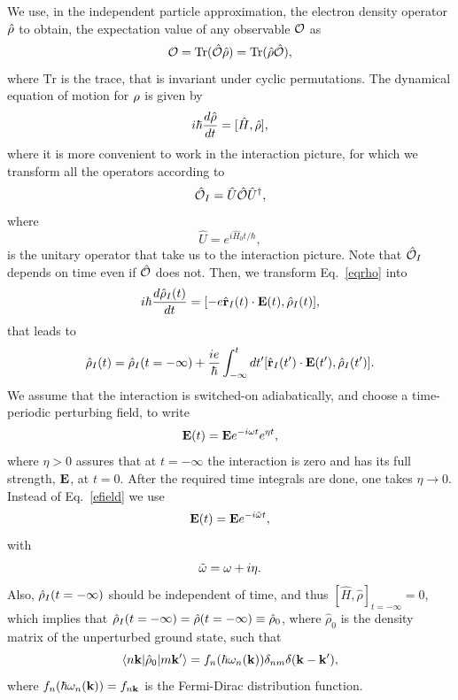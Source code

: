\documentclass{article}
\begin{document}
We use, in the independent particle approximation, the electron density
operator $\hat{{\rho}}$ to obtain, the expectation value of any observable
${\cal O}$ as
\begin{equation}\label{traza}
  {\cal O}=\mathrm{Tr}(\hat{{\cal O}}\hat\rho)=\mathrm{Tr}(\hat\rho\hat{{\cal O}}),
\end{equation}
where $\mathrm{Tr}$ is the trace, that is
invariant under cyclic permutations.
The dynamical equation of motion for ${\rho}$ is given by
\begin{equation}\label{eqrho}
i\hbar \frac{d\hat{{\rho}}}{dt}=[\hat{H},\hat{{\rho}}]
,
\end{equation}
where it is more convenient to work in the interaction picture, for
which we transform all the operators according to 
\begin{equation}\label{ip}
\hat{{\cal O}}_I=\hat{U}\hat{{\cal O}}\hat{U}^\dagger,
\end{equation}
where
\begin{equation}\label{ou}
\hat{U}=e^{i\hat{H}_0t/\hbar},
\end{equation}
is the unitary operator that take us to the interaction picture.
Note that $\hat{{\cal O}}_I$ depends on time even if $\hat{{\cal O}}$ does not.
Then, we transform Eq.~\eqref{eqrho} into
\begin{equation}\label{intrho}
i\hbar\frac{d\hat{{\rho}}_I(t)}{dt}=[-e\hat{\mathbf{r}}_I(t)\cdot\mathbf{E}(t),\hat{{\rho}}_I(t)],
\end{equation}
that leads to
\begin{equation}\label{intrho2}
\hat{{\rho}}_I(t)=\hat{{\rho}}_I(t=-\infty)
+
\frac{ie}{\hbar}\int_{-\infty}^t dt'[\hat{\mathbf{r}}_I(t')\cdot\mathbf{E}(t'),\hat{{\rho}}_I(t')].
\end{equation}
We assume that the interaction is switched-on adiabatically, and
choose a time-periodic perturbing field, to write
\begin{equation}\label{efield}
\mathbf{E}(t)=\mathbf{E} e^{-i\omega t}e^{\eta t}
,
\end{equation}
where $\eta > 0$ assures
that at $t=-\infty$ the interaction is zero and has its full strength, $\mathbf{E}$,
at $t=0$. After the required time integrals are done, one takes
$\eta\to 0$. Instead of Eq.~\eqref{efield} we use
\begin{equation}\label{efield2}
\mathbf{E}(t)=\mathbf{E} e^{-i\tilde\omega t}
,
\end{equation}
with
\begin{equation}\label{got}
\tilde\omega=\omega+i\eta
.
\end{equation}
Also, $\hat{{\rho}}_I(t=-\infty)$ should be independent of time, and thus 
$[\hat{H},\hat\rho]_{t=-\infty}=0$, which implies that 
$\hat{{\rho}}_I(t=-\infty)=\hat\rho(t=-\infty)\equiv\hat\rho_0$,
where $\hat\rho_0$ is
the density matrix of the unperturbed ground state,
such that
\begin{equation}\label{nrhon}
\langle n\mathbf{k} |\hat{{\rho}}_0| m\mathbf{k}' \rangle=f_n(\hbar\omega_n(\mathbf{k}))\delta_{nm}\delta(\mathbf{k}-\mathbf{k}')
,
\end{equation}
where $f_n(\hbar\omega_n(\mathbf{k}))=f_{n\mathbf{k}}$ is the Fermi-Dirac distribution function.
\end{document}
